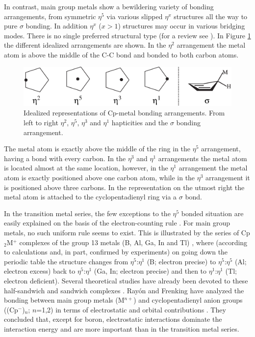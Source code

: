 In contrast, main group metals show a bewildering variety of bonding arrangements, from symmetric $\eta^{5}$ via various slipped $\eta^{x}$ structures all the way to pure $\sigma$ bonding. In addition $\eta^{x}$ ($x>1$) structures may occur in various bridging modes. There is no single preferred structural type (for a review see \cite{jutzi}). In Figure \ref{ch4.fig.bondarr} the different idealized arrangements are shown. In the $\eta^2$ arrangement the metal atom is above the middle of the C-C bond and bonded to both carbon atoms.
\begin{figure}[ht]
\center
\includegraphics[scale=0.8]{cyclopentadienyl/figures/bondarrangements.eps}
\caption{Idealized representations of Cp-metal bonding arrangements. From left to right $\eta^2$, $\eta^5$, $\eta^3$ and $\eta^1$ hapticities and the $\sigma$ bonding arrangement.}
\label{ch4.fig.bondarr}
\end{figure}
The metal atom is exactly above the middle of the ring in the $\eta^5$ arrangement, having a bond with every carbon. In the $\eta^3$ and $\eta^1$ arrangements the metal atom is located almost at the same location, however, in the $\eta^1$ arrangement the metal atom is exactly positioned above one carbon atom, while in the $\eta^3$ arrangement it is positioned above three carbons. In the representation on the utmost right the metal atom is attached to the cyclopentadienyl ring via a $\sigma$ bond. 

In the transition metal series, the few exceptions to the $\eta^{5}$ bonded situation are easily explained on the basis of the electron-counting rule \cite{shriver}.
For main group metals, no such uniform rule seems to exist. This is illustrated by the series of Cp$_2$M$^{+}$ complexes of the group 13 metals (B, Al, Ga, In and Tl) \cite{macdonald}, where (according to calculations and, in part, confirmed by experiments) on going down the periodic table the structure changes from $\eta^{5}$:$\eta^{1}$ (B; electron precise) to $\eta^{5}$:$\eta^{5}$ (Al; electron excess) back to $\eta^{5}$:$\eta^{1}$ (Ga, In; electron precise) and then to $\eta^{1}$:$\eta^{1}$ (Tl; electron deficient). 
%
%
Several theoretical studies have already been devoted to these half-sandwich and sandwich complexes \cite{kwon}. Ray\'{o}n and Frenking have analyzed the bonding between main group metals (M$^{n+}$) and cyclopentadienyl anion groups ((Cp$^{-}$)$_n$; $n$=1,2) in terms of electrostatic and orbital contributions \cite{rayon}. They concluded that, except for boron, electrostatic interactions dominate the interaction energy and are more important than in the transition metal series.

